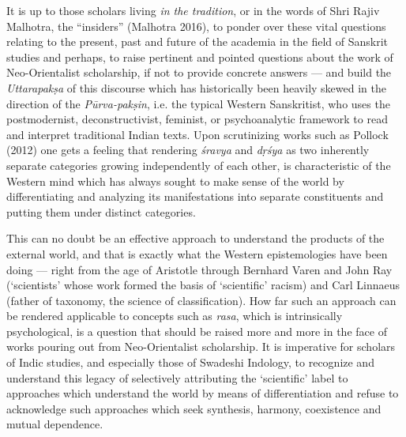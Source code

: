 It is up to those scholars living \textsl{in the tradition}, or in the words of Shri Rajiv Malhotra, the “insiders” (Malhotra 2016), to ponder over these vital questions relating to the present, past and future of the academia in the field of Sanskrit studies and perhaps, to raise pertinent and pointed questions about the work of Neo-Orientalist scholarship, if not to provide concrete answers --- and build the \textsl{Uttarapakṣa} of this discourse which has historically been heavily skewed in the direction of the \textsl{Pūrva-pakṣin}, i.e. the typical Western Sanskritist, who uses the postmodernist, deconstructivist, feminist, or psychoanalytic framework to read and interpret traditional Indian texts. Upon scrutinizing works such as Pollock (2012) one gets a feeling that rendering \textsl{śravya} and \textsl{dṛśya} as two inherently separate categories growing independently of each other, is characteristic of the Western mind which has always sought to make sense of the world by differentiating and analyzing its manifestations into separate constituents and putting them under distinct categories. 

This can no doubt be an effective approach to understand the products of the external world, and that is exactly what the Western epistemologies have been doing --- right from the age of Aristotle through Bernhard Varen and John Ray (‘scientists’ whose work formed the basis of ‘scientific’ racism) and Carl Linnaeus (father of taxonomy, the science of classification). How far such an approach can be rendered applicable to concepts such as \textsl{rasa}, which is intrinsically psychological, is a question that should be raised more and more in the face of works pouring out from Neo-Orientalist scholarship. It is imperative for scholars of Indic studies, and especially those of Swadeshi Indology, to recognize and understand this legacy of selectively attributing the ‘scientific’ label to approaches which understand the world by means of differentiation and refuse to acknowledge such approaches which seek synthesis, harmony, coexistence and mutual dependence.
 
